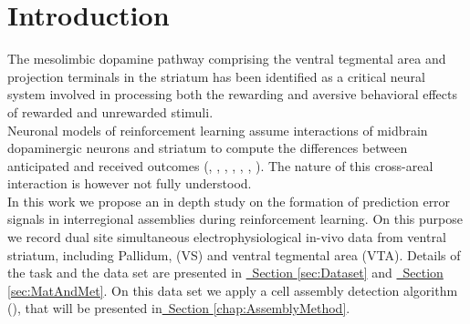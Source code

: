 \chapter{Introduction}
\label{chap:Introduction}
The mesolimbic dopamine pathway comprising the ventral tegmental area and projection terminals in the striatum has been identified as a critical neural system involved in processing both the rewarding and aversive behavioral effects of rewarded and unrewarded stimuli.\\Neuronal models of reinforcement learning assume interactions of midbrain dopaminergic neurons and striatum to compute the differences between anticipated and received outcomes (\cite{Schultz2001}, \cite{Schultz2002}, \cite{Fiorillo}, \cite{Eshel1}, \cite{Pagnoni}, \cite{Radua}, \cite{Takahashi2016}). The nature of this cross-areal interaction is however not fully understood.\\In this work we propose an in depth study on the formation of prediction error signals in interregional assemblies during reinforcement learning. On this purpose we record dual site simultaneous electrophysiological in-vivo data from ventral striatum, including Pallidum, (VS) and ventral tegmental area (VTA). Details of the task and the data set are presented in \hyperref[sec:Dataset]{~Section \ref*{sec:Dataset}} and \hyperref[sec:MatAndMet]{~Section \ref*{sec:MatAndMet}}. On this data set we apply a cell assembly detection algorithm (\cite{RussoDurstewitz}), that will be presented in\hyperref[chap:AssemblyMethod]{~Section \ref*{chap:AssemblyMethod}}.
